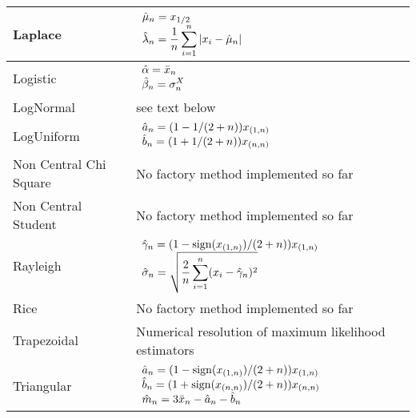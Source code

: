 {\begin{tabular}{|l|p{12cm}|}
    \hline
    Laplace & $\begin{array}{l}
      \displaystyle\Hat{\mu}_n = x_{1/2}\\
      \displaystyle\Hat{\lambda}_n = \frac{1}{n}\sum_{i=1}^n|x_i-\Hat{\mu}_n|
    \end{array}$\\
    \hline
    Logistic & $\begin{array}{l}
      \displaystyle\Hat{\alpha} = \bar{x}_n\\
      \displaystyle\Hat{\beta}_n = \sigma_n^X
    \end{array}$\\
    \hline
    LogNormal & see text below\\
    \hline
    LogUniform & $\begin{array}{l}
      \displaystyle\Hat{a}_n=(1-1/(2+n))x_{(1,n)}\\
      \displaystyle\Hat{b}_n=(1+1/(2+n))x_{(n,n)}
    \end{array}$\\
    \hline
    Non Central Chi Square   & No factory method implemented so far\\
    \hline
    Non Central Student   & No factory method implemented so far\\
    \hline
    Rayleigh & $\begin{array}{l}
      \displaystyle\Hat{\gamma}_n = (1-\mathrm{sign}(x_{(1,n)})/(2+n))x_{(1,n)}\\
      \displaystyle\Hat{\sigma}_n=\sqrt{\frac{2}{n}\sum_{i=1}^n(x_i-\Hat{\gamma}_n)^2}
    \end{array}$\\
    \hline
    Rice   & No factory method implemented so far\\
    \hline
    Trapezoidal   & Numerical resolution of maximum likelihood estimators\\
    \hline
    Triangular & $\begin{array}{l}
      \displaystyle\Hat{a}_n=(1-\mathrm{sign}(x_{(1,n)})/(2+n))x_{(1,n)}\\
      \displaystyle\Hat{b}_n=(1+\mathrm{sign}(x_{(n,n)})/(2+n))x_{(n,n)}\\
      \displaystyle\Hat{m}_n=3\bar{x}_n-\Hat{a}_n-\Hat{b}_n
    \end{array}$\\
    \hline
  \end{tabular}\rule{0pt}{1em}\\




}
